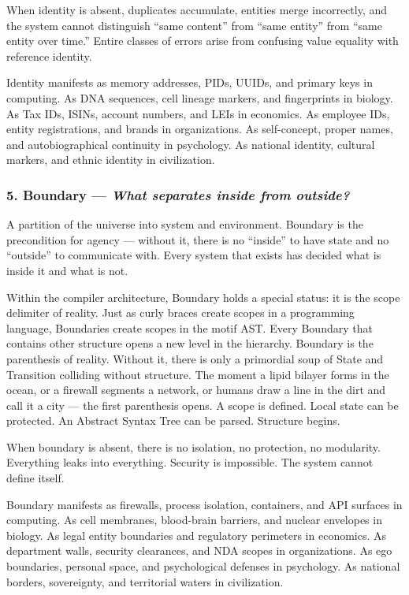 \documentclass[11pt,a4paper]{article}
\newcommand{\question}[1]{\textit{#1}}
\begin{document}
When identity is absent, duplicates accumulate, entities merge incorrectly, and the system cannot distinguish ``same content'' from ``same entity'' from ``same entity over time.'' Entire classes of errors arise from confusing value equality with reference identity.

Identity manifests as memory addresses, PIDs, UUIDs, and primary keys in computing. As DNA sequences, cell lineage markers, and fingerprints in biology. As Tax IDs, ISINs, account numbers, and LEIs in economics. As employee IDs, entity registrations, and brands in organizations. As self-concept, proper names, and autobiographical continuity in psychology. As national identity, cultural markers, and ethnic identity in civilization.

\subsubsection{5. Boundary --- \question{What separates inside from outside?}}

A partition of the universe into system and environment. Boundary is the precondition for agency --- without it, there is no ``inside'' to have state and no ``outside'' to communicate with. Every system that exists has decided what is inside it and what is not.

Within the compiler architecture, Boundary holds a special status: it is the scope delimiter of reality. Just as curly braces create scopes in a programming language, Boundaries create scopes in the motif AST. Every Boundary that contains other structure opens a new level in the hierarchy. Boundary is the parenthesis of reality. Without it, there is only a primordial soup of State and Transition colliding without structure. The moment a lipid bilayer forms in the ocean, or a firewall segments a network, or humans draw a line in the dirt and call it a city --- the first parenthesis opens. A scope is defined. Local state can be protected. An Abstract Syntax Tree can be parsed. Structure begins.

When boundary is absent, there is no isolation, no protection, no modularity. Everything leaks into everything. Security is impossible. The system cannot define itself.

Boundary manifests as firewalls, process isolation, containers, and API surfaces in computing. As cell membranes, blood-brain barriers, and nuclear envelopes in biology. As legal entity boundaries and regulatory perimeters in economics. As department walls, security clearances, and NDA scopes in organizations. As ego boundaries, personal space, and psychological defenses in psychology. As national borders, sovereignty, and territorial waters in civilization.
\end{document}
